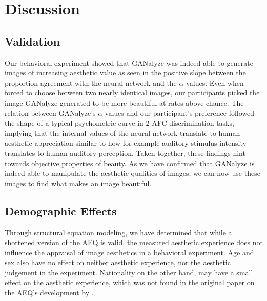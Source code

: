 \documentclass[../main.tex]{subfiles}
\begin{document}
\section{Discussion}

\subsection{Validation}
Our behavioral experiment showed that GANalyze was indeed able to generate images of increasing aesthetic value as seen in the positive slope between the proportion agreement with the neural network and the $\alpha$-values. Even when forced to choose between two nearly identical images, our participants picked the image GANalyze generated to be more beautiful at rates above chance. The relation between GANalyze's $\alpha$-values and our participant's preference followed the shape of a typical psychometric curve in 2-AFC discrimination tasks, implying that the internal values of the neural network translate to human aesthetic appreciation similar to how for example auditory stimulus intensity translates to human auditory perception. Taken together, these findings hint towards objective properties of beauty. As we have confirmed that GANalyze is indeed able to manipulate the aesthetic qualities of images, we can now use these images to find what makes an image beautiful.


\subsection{Demographic Effects}
Through structural equation modeling, we have determined that while a shortened version of the AEQ is valid, the measured aesthetic experience does not influence the appraisal of image aesthetics in a behavioral experiment. Age and sex also have no effect on neither aesthetic experience, nor the aesthetic judgement in the experiment. Nationality on the other hand, may have a small effect on the aesthetic experience, which was not found in the original paper on the AEQ’s development by \textcite{wanzerExperiencingFlowViewing2020}. 

\end{document}
